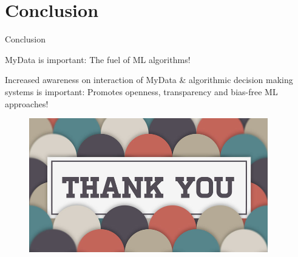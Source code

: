 \documentclass{beamer}
\begin{document}
\section*{Conclusion}
\begin{frame}{Conclusion}
\begin{block}{MyData is important:}
The fuel of ML algorithms! \pause
\end{block}
\begin{block}{Increased awareness on interaction of MyData \& algorithmic decision making systems is important:}
Promotes openness, transparency and bias-free ML approaches! 
 \end{block} 
\end{frame}

\begin{frame}{}
		\begin{figure}
	  		\vspace*{-0.0cm}
			\centering
			\includegraphics[trim = 0mm 10mm 0mm 0mm, clip, width=10.4cm]{thanks.jpg}
			\label{fig:res4}
		\end{figure}
\end{frame}
\end{document}
